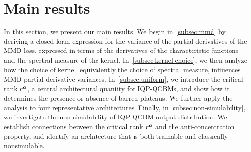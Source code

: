 \documentclass{article}
\theoremstyle{plain}
\theoremstyle{definition}
\theoremstyle{remark}
\begin{document}
\section{Main results} \label{sec:main-result}
In this section, we present our main results. We begin in~\cref{subsec:mmd} by deriving a closed-form expression for the variance of the partial derivatives of the MMD loss, expressed in terms of the derivatives of the characteristic functions and the spectral measure of the kernel.
In~\cref{subsec:kernel choice}, we then analyze how the choice of kernel, equivalently the choice of spectral measure, influences MMD partial derivative variances. 
In~\cref{subsec:uniform}, we introduce the critical rank $r^{\bm{a}}$, a central architectural quantity for IQP-QCBMs, and show how it determines the presence or absence of barren plateaus. We further apply the analysis to four representative architectures. 
Finally, in \cref{subsec:non-simulability}, we investigate the non-simulability of IQP-QCBM output distribution. We establish connections between the critical rank $r^{\bm{a}}$ and the anti-concentration property, and identify an architecture that is both trainable and classically nonsimulable.
\end{document}
